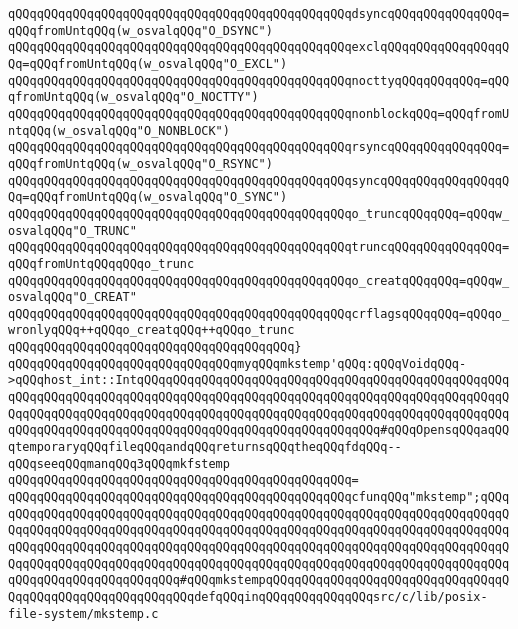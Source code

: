 \verb|qQQqqQQqqQQqqQQqqQQqqQQqqQQqqQQqqQQqqQQqqQQqqQQqdsyncqQQqqQQqqQQqqQQq=qQQqfromUntqQQq(w_osvalqQQq"O_DSYNC")|\newline
\verb|qQQqqQQqqQQqqQQqqQQqqQQqqQQqqQQqqQQqqQQqqQQqqQQqexclqQQqqQQqqQQqqQQqqQQq=qQQqfromUntqQQq(w_osvalqQQq"O_EXCL")|\newline
\verb|qQQqqQQqqQQqqQQqqQQqqQQqqQQqqQQqqQQqqQQqqQQqqQQqnocttyqQQqqQQqqQQq=qQQqfromUntqQQq(w_osvalqQQq"O_NOCTTY")|\newline
\verb|qQQqqQQqqQQqqQQqqQQqqQQqqQQqqQQqqQQqqQQqqQQqqQQqnonblockqQQq=qQQqfromUntqQQq(w_osvalqQQq"O_NONBLOCK")|\newline
\verb|qQQqqQQqqQQqqQQqqQQqqQQqqQQqqQQqqQQqqQQqqQQqqQQqrsyncqQQqqQQqqQQqqQQq=qQQqfromUntqQQq(w_osvalqQQq"O_RSYNC")|\newline
\verb|qQQqqQQqqQQqqQQqqQQqqQQqqQQqqQQqqQQqqQQqqQQqqQQqsyncqQQqqQQqqQQqqQQqqQQq=qQQqfromUntqQQq(w_osvalqQQq"O_SYNC")|\newline
\verb|qQQqqQQqqQQqqQQqqQQqqQQqqQQqqQQqqQQqqQQqqQQqqQQqo_truncqQQqqQQq=qQQqw_osvalqQQq"O_TRUNC"|\newline
\verb|qQQqqQQqqQQqqQQqqQQqqQQqqQQqqQQqqQQqqQQqqQQqqQQqtruncqQQqqQQqqQQqqQQq=qQQqfromUntqQQqqQQqo_trunc|\newline
\verb|qQQqqQQqqQQqqQQqqQQqqQQqqQQqqQQqqQQqqQQqqQQqqQQqo_creatqQQqqQQq=qQQqw_osvalqQQq"O_CREAT"|\newline
\verb|qQQqqQQqqQQqqQQqqQQqqQQqqQQqqQQqqQQqqQQqqQQqqQQqcrflagsqQQqqQQq=qQQqo_wronlyqQQq++qQQqo_creatqQQq++qQQqo_trunc|\newline
\newline
\verb|qQQqqQQqqQQqqQQqqQQqqQQqqQQqqQQqqQQqqQQq}|\newline
\newline
\verb|qQQqqQQqqQQqqQQqqQQqqQQqqQQqqQQqmyqQQqmkstemp'qQQq:qQQqVoidqQQq->qQQqhost_int::IntqQQqqQQqqQQqqQQqqQQqqQQqqQQqqQQqqQQqqQQqqQQqqQQqqQQqqQQqqQQqqQQqqQQqqQQqqQQqqQQqqQQqqQQqqQQqqQQqqQQqqQQqqQQqqQQqqQQqqQQqqQQqqQQqqQQqqQQqqQQqqQQqqQQqqQQqqQQqqQQqqQQqqQQqqQQqqQQqqQQqqQQqqQQqqQQqqQQqqQQqqQQqqQQqqQQqqQQqqQQqqQQqqQQqqQQqqQQqqQQqqQQq#qQQqOpensqQQqaqQQqtemporaryqQQqfileqQQqandqQQqreturnsqQQqtheqQQqfdqQQq--qQQqseeqQQqmanqQQq3qQQqmkfstemp|\newline
\verb|qQQqqQQqqQQqqQQqqQQqqQQqqQQqqQQqqQQqqQQqqQQqqQQq=|\newline
\verb|qQQqqQQqqQQqqQQqqQQqqQQqqQQqqQQqqQQqqQQqqQQqqQQqcfunqQQq"mkstemp";qQQqqQQqqQQqqQQqqQQqqQQqqQQqqQQqqQQqqQQqqQQqqQQqqQQqqQQqqQQqqQQqqQQqqQQqqQQqqQQqqQQqqQQqqQQqqQQqqQQqqQQqqQQqqQQqqQQqqQQqqQQqqQQqqQQqqQQqqQQqqQQqqQQqqQQqqQQqqQQqqQQqqQQqqQQqqQQqqQQqqQQqqQQqqQQqqQQqqQQqqQQqqQQqqQQqqQQqqQQqqQQqqQQqqQQqqQQqqQQqqQQqqQQqqQQqqQQqqQQqqQQqqQQqqQQqqQQqqQQqqQQqqQQqqQQqqQQqqQQqqQQqqQQq#qQQqmkstempqQQqqQQqqQQqqQQqqQQqqQQqqQQqqQQqqQQqqQQqqQQqqQQqqQQqqQQqqQQqdefqQQqinqQQqqQQqqQQqqQQqsrc/c/lib/posix-file-system/mkstemp.c|\newline
